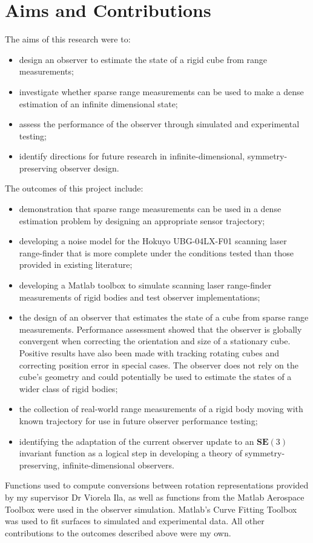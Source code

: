 \chapter*{Aims and Contributions}

The aims of this research were to:
\begin{itemize}
\item design an observer to estimate the state of a rigid cube from range measurements;
\item investigate whether sparse range measurements can be used to make a dense estimation of an infinite dimensional state;
\item assess the performance of the observer through simulated and experimental testing; 
\item identify directions for future research in infinite-dimensional, symmetry-preserving observer design.
\end{itemize}

The outcomes of this project include:
\begin{itemize}
\item demonstration that sparse range measurements can be used in a dense estimation problem by designing an appropriate sensor trajectory;
\item developing a noise model for the Hokuyo UBG-04LX-F01 scanning laser range-finder that is more complete under the conditions tested than those provided in existing literature;
\item developing a Matlab toolbox to simulate scanning laser range-finder measurements of rigid bodies and test observer implementations;
\item the design of an observer that estimates the state of a cube from sparse range measurements. Performance assessment showed that the observer is globally convergent when correcting the orientation and size of a stationary cube. Positive results have also been made with tracking rotating cubes and correcting position error in special cases. The observer does not rely on the cube's geometry and could potentially be used to estimate the states of a wider class of rigid bodies;
\item the collection of real-world range measurements of a rigid body moving with known trajectory for use in future observer performance testing;
\item identifying the adaptation of the current observer update to an $\mathbf{SE}(3)$ invariant function as a logical step in developing a theory of symmetry-preserving, infinite-dimensional observers.
\end{itemize}

Functions used to compute conversions between rotation representations provided by my supervisor Dr Viorela Ila, as well as functions from the Matlab Aerospace Toolbox were used in the observer simulation. Matlab's Curve Fitting Toolbox was used to fit surfaces to simulated and experimental data.
All other contributions to the outcomes described above were my own.